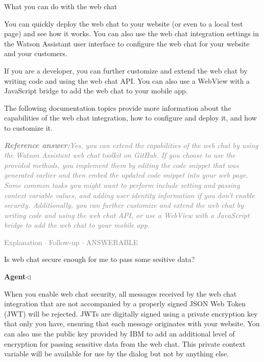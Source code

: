 \documentclass[a4paper,11pt]{article}
\begin{document}
\begin{docenv}
{ What you can do with the web chat 

You can quickly deploy the web chat to your website (or even to a local test page) and see how it works. You can also use the web chat integration settings in the Watson Assistant user interface to configure the web chat for your website and your customers.

If you are a developer, you can further customize and extend the web chat by writing code and using the web chat API. You can also use a WebView with a JavaScript bridge to add the web chat to your mobile app.

The following documentation topics provide more information about the capabilities of the web chat integration, how to configure and deploy it, and how to customize it.}
\end{docenv}
\begin{refanswerenv}
{\footnotesize\textit{\textcolor{gray}{\textbf{Reference answer:}\enspace Yes, you can extend the capabilities of the web chat by using the Watson Assistant web chat toolkit on GitHub. If you choose to use the provided methods, you implement them by editing the code snippet that was generated earlier and then embed the updated code snippet into your web page. Some common tasks you might want to perform include setting and passing context variable values, and adding user identity information if you don't enable security. Additionally, you can further customize and extend the web chat by writing code and using the web chat API, or use a WebView with a JavaScript bridge to add the web chat to your mobile app.}}}
\end{refanswerenv}
\vspace{0.5em}
\hfill{\tiny\textcolor{gray}{Explanation $\cdot$ Follow-up $\cdot$ ANSWERABLE}}
\begin{userbubble}
Is web chat secure enough for me to pass some sesitive data?
\end{userbubble}
\noindent\hfill{\small\textcolor{agentcolor}{\textbf{Agent\enspace$\triangleleft$}}}
\begin{agentbubble}
When you enable web chat security, all messages received by the web chat integration that are not accompanied by a properly signed JSON Web Token (JWT) will be rejected. JWTs are digitally signed using a private encryption key that only you have, ensuring that each message originates with your website. You can also use the public key provided by IBM to add an additional level of encryption for passing sensitive data from the web chat. This private context variable will be available for use by the dialog but not by anything else.
\end{agentbubble}
\end{document}
